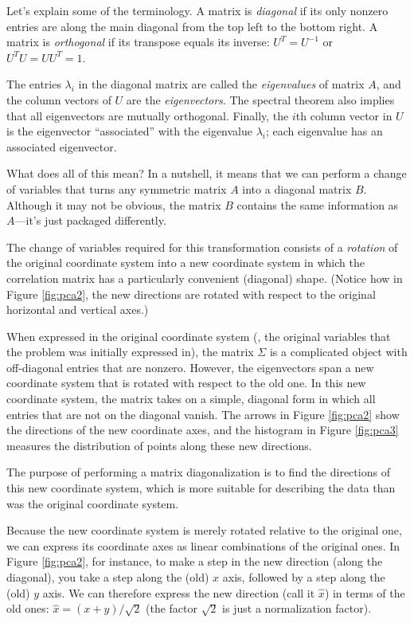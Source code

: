 
Let's explain some of the terminology. A matrix is \emph{diagonal} if
its only nonzero entries are along the main diagonal from the top left
to the bottom right. A matrix is \emph{orthogonal} if its transpose
equals its inverse: $U^T = U^{-1}$ or $U^T U = U U^T = 1$.

The entries $\lambda_i$ in the diagonal matrix are called the
\emph{eigenvalues} of matrix $A$, and the column vectors of $U$ are the
\emph{eigenvectors}. The
spectral theorem also implies that all eigenvectors are mutually
orthogonal. Finally, the $i$th column vector in $U$ is the eigenvector
``associated'' with the eigenvalue
$\lambda_i$; each eigenvalue has an associated eigenvector.

What does all of this mean?  In a nutshell, it means that we can
perform a change of variables that turns any symmetric matrix $A$ into
a diagonal matrix $B$.  Although it may not be obvious, the matrix $B$
contains the same information as $A$---it's just packaged differently.

The change of variables required for this transformation consists of a
\emph{rotation} of the original coordinate system into a new
coordinate system in which the correlation matrix has a particularly
convenient (diagonal) shape. (Notice how in Figure \ref{fig:pca2}, the
new directions are rotated with respect to the original horizontal and
vertical axes.)

When expressed in the original coordinate system (\ie, the original
variables that the problem was initially expressed in), the matrix
$\Sigma$ is a complicated object with off-diagonal entries that are
nonzero.  However, the eigenvectors span a new coordinate system that
is rotated with respect to the old one. In this new coordinate system,
the matrix takes on a simple, diagonal form in which all entries that
are not on the diagonal vanish. The arrows in Figure \ref{fig:pca2}
show the directions of the new coordinate axes, and the histogram in
Figure \ref{fig:pca3} measures the distribution of points along these
new directions.

The purpose of performing a matrix diagonalization is to find the
directions of this new coordinate system, which is more suitable for
describing the data than was the original coordinate system.

Because the new coordinate system is merely rotated relative to the
original one, we can express its coordinate axes as linear
combinations of the original ones. In Figure \ref{fig:pca2}, for
instance, to make a step in the new direction (along the diagonal), you
take a step along the (old) $x$ axis,\vadjust{\pagebreak} followed by a step along the
(old) $y$ axis. We can therefore express the new direction (call it
$\hat{x}$) in terms of the old ones: $\hat{x} = (x + y)/\sqrt{2}$ (the
factor $\sqrt{2}$ is just a normalization factor).

